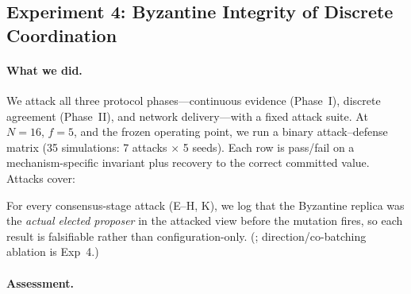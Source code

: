 \documentclass[letterpaper,10pt,conference]{IEEEtran}
\begin{document}
\subsection{Experiment 4: Byzantine Integrity of Discrete Coordination}
\label{sec:eval-phase2}


\paragraph{What we did.}


We attack all three protocol phases---continuous evidence (Phase~I),
discrete agreement (Phase~II), and network delivery---with a fixed attack
suite. At $N{=}16$, $f{=}5$, and the frozen operating point, we run a
binary attack--defense matrix (35 simulations: 7 attacks $\times$ 5 seeds).
Each row is pass/fail on a mechanism-specific invariant plus recovery to
the correct committed value. Attacks cover:


For every consensus-stage attack (E--H, K), we log that the Byzantine
replica was the \emph{actual elected proposer} in the attacked view before
the mutation fires, so each result is falsifiable rather than
configuration-only. (; direction/co-batching
ablation is Exp~4.)

\paragraph{Assessment.}
\end{document}
